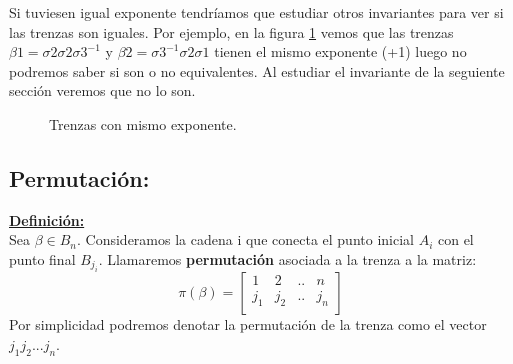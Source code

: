 Si tuviesen igual exponente tendríamos que estudiar otros invariantes para ver si las trenzas son iguales. Por ejemplo, en la figura \ref{exp3} vemos que las trenzas $\beta1 = \sigma2\sigma2\sigma3^{-1}$ y $\beta2 = \sigma3^{-1}\sigma2\sigma1$ tienen el mismo exponente (+1) luego no podremos saber si son o no equivalentes. Al estudiar el invariante de la seguiente sección veremos que no lo son.  \\
	\begin{figure}[h!]
		\centering
		\caption{Trenzas con mismo exponente.}
		\label{exp3} 
	\end{figure}

\bigskip
\subsection{Permutación:}\label{invtren2}
\textbf{\underline{Definición:}}\\
Sea $\beta \in B_{n}$. Consideramos la cadena i que conecta el punto inicial $ A_{i}$ con el punto final $B_{j_{i}}$. Llamaremos \textbf{permutación} asociada a la trenza a la matriz:\\
\[\pi(\beta)=\begin{bmatrix}
1 & 2 & .. & n\\
j_{1} & j_{2} & .. & j_{n} \\
\end{bmatrix}\]
Por simplicidad podremos denotar la permutación de la trenza como el vector $j_{1} j_{2} ... j_{n}$.\\

